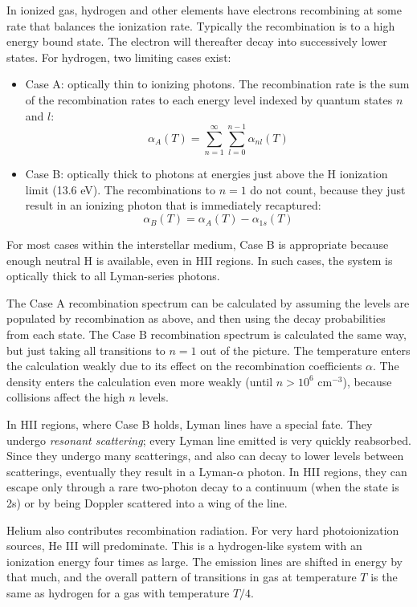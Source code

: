 In ionized gas, hydrogen and other elements have electrons recombining
at some rate that balances the ionization rate. Typically the
recombination is to a high energy bound state. The electron will
thereafter decay into successively lower states. For hydrogen, two
limiting cases exist:
\begin{itemize}
\item Case A: optically thin to ionizing photons. The recombination
  rate is the sum of the recombination rates to each energy level
  indexed by quantum states $n$ and $l$:
  \begin{equation}
    \alpha_A(T) =
    \sum_{n=1}^{\infty} 
    \sum_{l=0}^{n-1} \alpha_{nl}(T)
  \end{equation}
\item Case B: optically thick to photons at energies just above the H
  ionization limit (13.6 eV). The recombinations to $n=1$ do not
  count, because they just result in an ionizing photon that is
  immediately recaptured:
  \begin{equation}
    \alpha_B(T) = \alpha_A(T) - \alpha_{1s} (T)
  \end{equation}
\end{itemize}
For most cases within the interstellar medium, Case B is appropriate
because enough neutral H is available, even in HII regions. In such
cases, the system is optically thick to all Lyman-series photons.

The Case A recombination spectrum can be calculated by assuming the
levels are populated by recombination as above, and then using the
decay probabilities from each state. The Case B recombination spectrum
is calculated the same way, but just taking all transitions to $n=1$
out of the picture. The temperature enters the calculation weakly due
to its effect on the recombination coefficients $\alpha$. The density
enters the calculation even more weakly (until $n>10^6$ cm$^{-3}$),
because collisions affect the high $n$ levels.

In HII regions, where Case B holds, Lyman lines have a special
fate. They undergo {\it resonant scattering}; every Lyman line emitted
is very quickly reabsorbed. Since they undergo many scatterings, and
also can decay to lower levels between scatterings, eventually they
result in a Lyman-$\alpha$ photon. In HII regions, they can escape
only through a rare two-photon decay to a continuum (when the state is
2s) or by being Doppler scattered into a wing of the line. 

Helium also contributes recombination radiation. For very hard
photoionization sources, He III will predominate. This is a
hydrogen-like system with an ionization energy four times as
large. The emission lines are shifted in energy by that much, and the
overall pattern of transitions in gas at temperature $T$ is the same
as hydrogen for a gas with temperature $T/4$.


